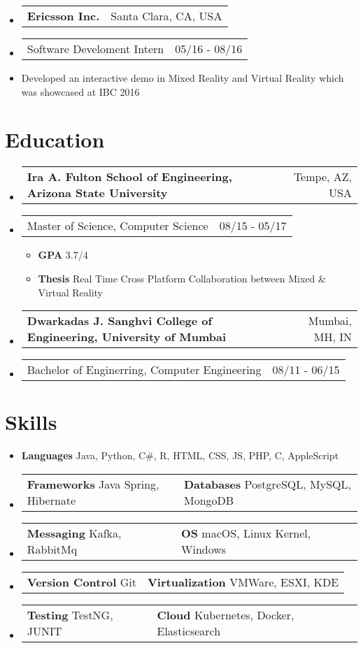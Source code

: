 \documentclass[a4paper,12pt]{article} %
\makeatletter
\newcommand\tableVerticalSpace{-1em}
\newcommand\tableItemVerticalSpace{-1em}
\newcommand\zeroSpacing{0em}
\newcommand\sectionSpacing{0.5em}
\newcommand{\fourElementListStart}{\begin{itemize}[label={},leftmargin=*]\setlength\itemsep{0.3em}}
\newcommand{\fourElementListEnd}{\end{itemize}\vspace{\zeroSpacing}}
\newcommand{\generalListStart}{\vspace{\zeroSpacing}\begin{itemize}[leftmargin=2em]\setlength\itemsep{-0.4em}}
\newcommand{\generalListEnd}{\end{itemize}\vspace{\zeroSpacing}}
\newcommand{\generalSubListStart}{\vspace{-1em}\begin{itemize}[leftmargin=2em]\setlength\itemsep{-0.2em}}
\newcommand{\generalSubListEnd}{\end{itemize}\vspace{\zeroSpacing}}
\newcommand{\institutionItem}[2]{
	\vspace{\tableItemVerticalSpace}\item
		\begin{tabular*}{\textwidth}{@{}l@{\extracolsep{\fill}}r@{}}
			\textbf{#1} & {\small{#2}} \\[\zeroSpacing]
		\end{tabular*}\vspace{\tableVerticalSpace}
}
\newcommand{\twoElementItem}[2]{
	\vspace{\tableItemVerticalSpace}\item
		\begin{tabular*}{\textwidth}{@{}l@{\extracolsep{\fill}}r@{}}
			{#1} & {\small{#2}} \\[\zeroSpacing]
		\end{tabular*}\vspace{\tableVerticalSpace}
}
\newcommand{\twoKeyValuePairElementItem}[4]{
	\vspace{\tableItemVerticalSpace}\item
		\begin{tabular}{@{}p{7cm}p{11cm}}

			\vspace{0.5em}\textbf{#1}{ #2} & \vspace{0.5em}\textbf{#3}{ #4}

		\end{tabular}\vspace{\tableVerticalSpace}
}
\newcommand{\oneKeyValuePairElement}[2]{
	\item \textbf{#1}{ #2}
}
\makeatother
\begin{document}
\fourElementListStart
	\institutionItem {Ericsson Inc.}{Santa Clara, CA, USA}
	\twoElementItem{Software Develoment Intern}{05/16 - 08/16}\vspace{-1.3em}
\fourElementListEnd

\generalListStart
	\item Developed an interactive demo in Mixed Reality and Virtual Reality which was showcased at IBC 2016\vspace{-1em}
\generalListEnd

\vspace{\sectionSpacing}\section*{Education}

\fourElementListStart
	\institutionItem {Ira A. Fulton School of Engineering, Arizona State University}{Tempe, AZ, USA}
	\twoElementItem {Master of Science, Computer Science}{08/15 - 05/17}
	\generalSubListStart
		\item \textbf{GPA} 3.7/4
		\item \textbf{Thesis} Real Time Cross Platform Collaboration between Mixed \& Virtual Reality
	\generalSubListEnd
	\institutionItem {Dwarkadas J. Sanghvi College of Engineering, University of Mumbai}{Mumbai, MH, IN}
	\twoElementItem {Bachelor of Enginerring, Computer Engineering}{08/11 - 06/15}
\fourElementListEnd


\vspace{0.8em}\section*{Skills}

\generalListStart
	\vspace{-0.5em}\oneKeyValuePairElement{Languages}{Java, Python, C\#, R, HTML, CSS, JS, PHP, C, AppleScript}
	\twoKeyValuePairElementItem{Frameworks}{Java Spring, Hibernate}{Databases}{PostgreSQL, MySQL, MongoDB}
	\vspace{-0.5em}\twoKeyValuePairElementItem{Messaging}{Kafka, RabbitMq}{OS}{macOS, Linux Kernel, Windows}
	\vspace{-0.5em}\twoKeyValuePairElementItem{Version Control}{Git}{Virtualization}{VMWare, ESXI, KDE}
	\vspace{-0.5em}\twoKeyValuePairElementItem{Testing} {TestNG, JUNIT}{Cloud}{Kubernetes, Docker, Elasticsearch}\vspace{-1em}
\generalListEnd
\end{document}
